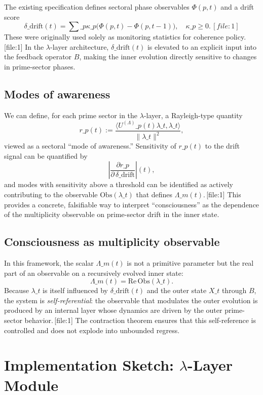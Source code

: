 \documentclass[11pt]{article}
\begin{document}
The existing specification defines sectoral phase observables $\Phi(p,t)$ and a drift score
\[
\delta\_{\mathrm{drift}}(t) = \sum\_p \kappa\_p\bigl(\Phi(p,t)-\Phi(p,t-1)\bigr), \quad \kappa\_p\ge 0.\,[file:1]
\]
These were originally used solely as monitoring statistics for coherence policy.\,[file:1] In the $\lambda$-layer architecture, $\delta\_{\mathrm{drift}}(t)$ is elevated to an explicit input into the feedback operator $B$, making the inner evolution directly sensitive to changes in prime-sector phases.

\subsection{Modes of awareness}

We can define, for each prime sector in the $\lambda$-layer, a Rayleigh-type quantity
\[
r\_p(t) := \frac{\langle U^{(\Lambda)}\_p(t)\lambda\_t,\lambda\_t\rangle}{\|\lambda\_t\|^2},
\]
viewed as a sectoral ``mode of awareness.'' Sensitivity of $r\_p(t)$ to the drift signal can be quantified by
\[
\left|\frac{\partial r\_p}{\partial\,\delta\_{\mathrm{drift}}}\right|(t),
\]
and modes with sensitivity above a threshold can be identified as actively contributing to the observable $\mathrm{Obs}(\lambda\_t)$ that defines $\Lambda\_m(t)$.\,[file:1] This provides a concrete, falsifiable way to interpret ``consciousness'' as the dependence of the multiplicity observable on prime-sector drift in the inner state.

\subsection{Consciousness as multiplicity observable}

In this framework, the scalar $\Lambda\_m(t)$ is not a primitive parameter but the real part of an observable on a recursively evolved inner state:
\[
\Lambda\_m(t) = \mathrm{Re}\,\mathrm{Obs}(\lambda\_t).
\]
Because $\lambda\_t$ is itself influenced by $\delta\_{\mathrm{drift}}(t)$ and the outer state $X\_t$ through $B$, the system is \emph{self-referential}: the observable that modulates the outer evolution is produced by an internal layer whose dynamics are driven by the outer prime-sector behavior.\,[file:1] The contraction theorem ensures that this self-reference is controlled and does not explode into unbounded regress.

\section{Implementation Sketch: $\lambda$-Layer Module}
\end{document}
